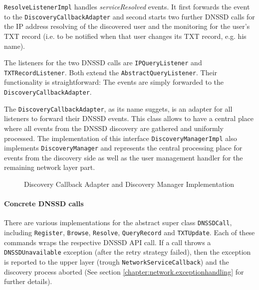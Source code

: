 \texttt{ResolveListenerImpl} handles \emph{serviceResolved} events. It first forwards the event to the \texttt{DiscoveryCallbackAdapter} and second starts two further DNSSD calls for the IP address resolving of the discovered user and the monitoring for the user's TXT record (i.e. to be notified when that user changes its TXT record, e.g. his name).

The listeners for the two DNSSD calls are \texttt{IPQueryListener} and \texttt{TXTRecordListener}. Both extend the \texttt{AbstractQueryListener}. Their functionality is straightforward: The events are simply forwarded to the \texttt{DiscoveryCallbackAdapter}.

The \texttt{DiscoveryCallbackAdapter}, as its name suggets, is an adapter for all listeners to forward their DNSSD events. This class allows to have a central place where all events from the DNSSD discovery are gathered and uniformly processed. The implementation of this interface \texttt{DiscoveryManagerImpl} also implements \texttt{DiscoveryManager} and represents the central processing place for events from the discovery side as well as the user management handler for the remaining network layer part.

\begin{figure}[H]
 \centering
 \caption{Discovery Callback Adapter and Discovery Manager Implementation}
 \label{fig:network.discovery.managerandadapter}
\end{figure}


\paragraph{Concrete DNSSD calls}
\label{chapter:network.discovery.dnssdcalls}
There are various implementations for the abstract super class \texttt{DNSSDCall}, including \texttt{Register}, \texttt{Browse}, \texttt{Resolve}, \texttt{QueryRecord} and \texttt{TXTUpdate}. Each of these commands wraps the respective DNSSD API call. If a call throws a \texttt{DNSSDUnavailable} exception (after the retry strategy failed), then the exception is reported to the upper layer (trough \texttt{NetworkServiceCallback}) and the discovery process aborted (See section \ref{chapter:network.exceptionhandling} for further details).

